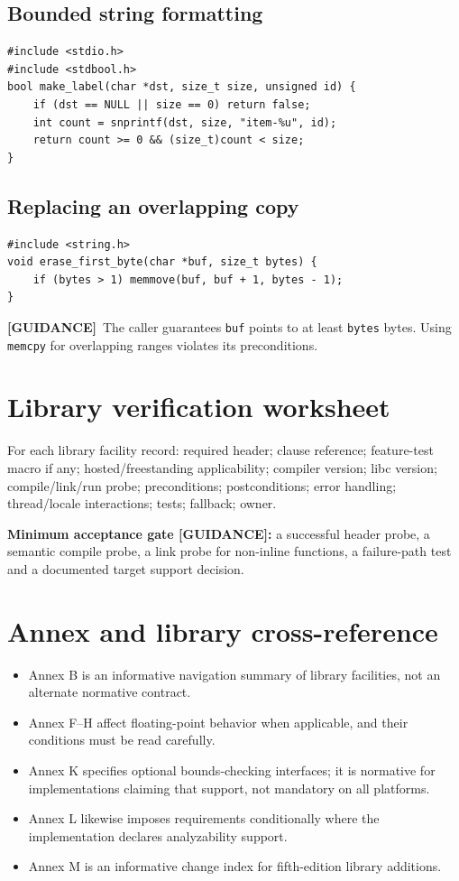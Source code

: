\documentclass[10pt,letterpaper,oneside]{report}
\newcommand{\guidance}{\textbf{[GUIDANCE]}}
\begin{document}
\section{Bounded string formatting}
\begin{lstlisting}
#include <stdio.h>
#include <stdbool.h>
bool make_label(char *dst, size_t size, unsigned id) {
    if (dst == NULL || size == 0) return false;
    int count = snprintf(dst, size, "item-%u", id);
    return count >= 0 && (size_t)count < size;
}
\end{lstlisting}
\section{Replacing an overlapping copy}
\begin{lstlisting}
#include <string.h>
void erase_first_byte(char *buf, size_t bytes) {
    if (bytes > 1) memmove(buf, buf + 1, bytes - 1);
}
\end{lstlisting}
\guidance\ The caller guarantees \texttt{buf} points to at least \texttt{bytes} bytes. Using \texttt{memcpy} for overlapping ranges violates its preconditions.
\chapter{Library verification worksheet}
For each library facility record: required header; clause reference; feature-test macro if any; hosted/freestanding applicability; compiler version; libc version; compile/link/run probe; preconditions; postconditions; error handling; thread/locale interactions; tests; fallback; owner.\par
\begin{keybox}\textbf{Minimum acceptance gate [GUIDANCE]:} a successful header probe, a semantic compile probe, a link probe for non-inline functions, a failure-path test and a documented target support decision.\end{keybox}
\chapter{Annex and library cross-reference}
\begin{itemize}
\item Annex B is an informative navigation summary of library facilities, not an alternate normative contract.
\item Annex F--H affect floating-point behavior when applicable, and their conditions must be read carefully.
\item Annex K specifies optional bounds-checking interfaces; it is normative for implementations claiming that support, not mandatory on all platforms.
\item Annex L likewise imposes requirements conditionally where the implementation declares analyzability support.
\item Annex M is an informative change index for fifth-edition library additions.
\end{itemize}
\end{document}
